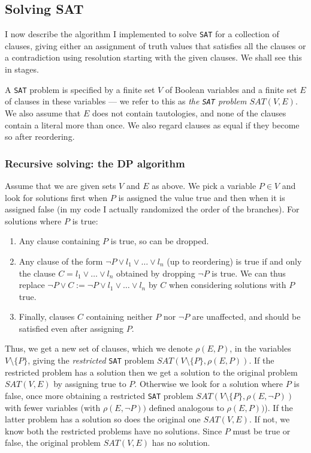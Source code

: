 \hypertarget{solving-sat}{%
\subsection{Solving SAT}\label{solving-sat}}

I now describe the algorithm I implemented to solve \texttt{SAT} for a
collection of clauses, giving either an assignment of truth values that
satisfies all the clauses or a contradiction using resolution starting
with the given clauses. We shall see this in stages.

A \texttt{SAT} problem is specified by a finite set \(V\) of Boolean
variables and a finite set \(E\) of clauses in these variables --- we
refer to this as \emph{the \texttt{SAT} problem \(SAT(V, E)\)}. We also
assume that \(E\) does not contain tautologies, and none of the clauses
contain a literal more than once. We also regard clauses as equal if
they become so after reordering.

\hypertarget{recursive-solving-the-dp-algorithm}{%
\subsubsection{Recursive solving: the DP
algorithm}\label{recursive-solving-the-dp-algorithm}}

Assume that we are given sets \(V\) and \(E\) as above. We pick a
variable \(P\in V\) and look for solutions first when \(P\) is assigned
the value true and then when it is assigned false (in my code I actually
randomized the order of the branches). For solutions where \(P\) is
true:

\begin{enumerate}
\def\labelenumi{\arabic{enumi}.}
\tightlist
\item
  Any clause containing \(P\) is true, so can be dropped.
\item
  Any clause of the form \(\neg P\vee l_1\vee\dots\vee l_n\) (up to
  reordering) is true if and only the clause \(C =l_1\vee\dots\vee l_n\)
  obtained by dropping \(\neg P\) is true. We can thus replace
  \(\neg P \vee C := \neg P\vee l_1\vee\dots\vee l_n\) by \(C\) when
  considering solutions with \(P\) true.
\item
  Finally, clauses \(C\) containing neither \(P\) nor \(\neg P\) are
  unaffected, and should be satisfied even after assigning \(P\).
\end{enumerate}

Thus, we get a new set of clauses, which we denote \(\rho(E, P)\), in
the variables \(V\setminus\{P\}\), giving the \emph{restricted}
\texttt{SAT} problem \(SAT(V\setminus\{P\}, \rho(E, P))\). If the
restricted problem has a solution then we get a solution to the original
problem \(SAT(V, E)\) by assigning true to \(P\). Otherwise we look for
a solution where \(P\) is false, once more obtaining a restricted
\texttt{SAT} problem \(SAT(V\setminus\{P\}, \rho(E, \neg P))\) with
fewer variables (with \(\rho(E, \neg P))\) defined analogous to
\(\rho(E, P))\)). If the latter problem has a solution so does the
original one \(SAT(V, E)\). If not, we know both the restricted problems
have no solutions. Since \(P\) must be true or false, the original
problem \(SAT(V, E)\) has no solution.

